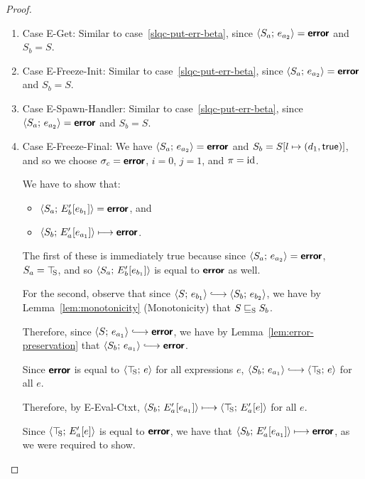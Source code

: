 \begin{proof}
\begin{enumerate}
\begin{enumerate}
    \item \label{slqc-put-err-get}Case {\sc E-Get}: Similar to
      case~\ref{slqc-put-err-beta}, since $\langle S_a;\, e_{a_2} \rangle =
      \textbf{\textsf{error}}$ and $S_b = S$.
    \item \label{slqc-put-err-freeze-init}Case {\sc E-Freeze-Init}:
      Similar to case~\ref{slqc-put-err-beta}, since
      $\langle S_a;\, e_{a_2} \rangle = \textbf{\textsf{error}}$ and $S_b = S$.
    \item \label{slqc-put-err-spawn-handler}Case {\sc
      E-Spawn-Handler}: Similar to case~\ref{slqc-put-err-beta}, since
      $\langle S_a;\, e_{a_2} \rangle = \textbf{\textsf{error}}$ and $S_b = S$.
    \item \label{slqc-put-err-freeze-final}Case {\sc E-Freeze-Final}:
      We have $\langle S_a;\, e_{a_2} \rangle = \textbf{\textsf{error}}$ and $S_b =
      S[l \mapsto (d_1, \textsf{true})]$, and so we choose $\sigma_c =
      \textbf{\textsf{error}}$, $i = 0$, $j = 1$, and $\pi = \mathrm{id}$.

      We have to show that:
      \begin{itemize}
      \item $\langle S_a;\, E'_b\hspace{-0.5mm}\left[e_{b_1}\right] \rangle = \textbf{\textsf{error}}$,
        and
      \item $\langle S_b;\, E'_a\hspace{-0.5mm}\left[e_{a_1}\right] \rangle \longmapsto
        \textbf{\textsf{error}}$.
      \end{itemize}

      The first of these is immediately true because since
      $\langle S_a;\, e_{a_2} \rangle = \textbf{\textsf{error}}$, $S_a = \top\hspace{-0.85mm}_{\mathrm{S}}$, and so
      $\langle S_a;\, E'_b\hspace{-0.5mm}\left[e_{b_1}\right] \rangle$ is equal to $\textbf{\textsf{error}}$ as
      well.

      For the second, observe that since $\config{S}{e_{b_1}}
      \parstepsto \config{S_b}{e_{b_2}}$, we have by
      Lemma~\ref{lem:monotonicity} (Monotonicity) that
      $S \sqsubseteq_{\mathrm{S}} S_b$.

      Therefore, since $\config{S}{e_{a_1}} \parstepsto \error$, we
      have by Lemma~\ref{lem:error-preservation} that
      $\config{S_b}{e_{a_1}} \parstepsto \error$.

      Since $\textbf{\textsf{error}}$ is equal to $\langle \top\hspace{-0.85mm}_{\mathrm{S}};\, e \rangle$ for all
      expressions $e$, $\config{S_b}{e_{a_1}} \parstepsto
      \config{\topS}{e}$ for all $e$.

      Therefore, by {\sc E-Eval-Ctxt},
      $\langle S_b;\, E'_a\hspace{-0.5mm}\left[e_{a_1}\right] \rangle \longmapsto
      \langle \top\hspace{-0.85mm}_{\mathrm{S}};\, E'_a\hspace{-0.5mm}\left[e\right] \rangle$ for all $e$.

      Since $\langle \top\hspace{-0.85mm}_{\mathrm{S}};\, E'_a\hspace{-0.5mm}\left[e\right] \rangle$ is equal to $\textbf{\textsf{error}}$,
      we have that $\langle S_b;\, E'_a\hspace{-0.5mm}\left[e_{a_1}\right] \rangle \longmapsto
      \textbf{\textsf{error}}$, as we were required to show.


\end{enumerate}
\end{enumerate}
\end{proof}
